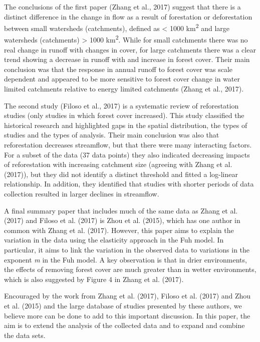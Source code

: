 \documentclass[]{elsarticle} %
\begin{document}
The conclusions of the first paper (Zhang et al., 2017) suggest that there is a distinct difference in the change in flow as a result of forestation or deforestation between small watersheds (catchments), defined as \textless{} 1000 km\textsuperscript{2} and large watersheds (catchments) \textgreater{} 1000 km\textsuperscript{2}. While for small catchments there was no real change in runoff with changes in cover, for large catchments there was a clear trend showing a decrease in runoff with and increase in forest cover. Their main conclusion was that the response in annual runoff to forest cover was scale dependent and appeared to be more sensitive to forest cover change in water limited catchments relative to energy limited catchments (Zhang et al., 2017).

The second study (Filoso et al., 2017) is a systematic review of reforestation studies (only studies in which forest cover increased). This study classified the historical research and highlighted gaps in the spatial distribution, the types of studies and the types of analysis. Their main conclusion was also that reforestation decreases streamflow, but that there were many interacting factors. For a subset of the data (37 data points) they also indicated decreasing impacts of reforestation with increasing catchment size (agreeing with Zhang et al. (2017)), but they did not identify a distinct threshold and fitted a log-linear relationship. In addition, they identified that studies with shorter periods of data collection resulted in larger declines in streamflow.

A final summary paper that includes much of the same data as Zhang et al. (2017) and Filoso et al. (2017) is Zhou et al. (2015), which has one author in common with Zhang et al. (2017). However, this paper aims to explain the variation in the data using the elasticity approach in the Fuh model. In particular, it aims to link the variation in the observed data to variations in the exponent \emph{m} in the Fuh model. A key observation is that in drier environments, the effects of removing forest cover are much greater than in wetter environments, which is also suggested by Figure 4 in Zhang et al. (2017).

Encouraged by the work from Zhang et al. (2017), Filoso et al. (2017) and Zhou et al. (2015) and the large database of studies presented by these authors, we believe more can be done to add to this important discussion. In this paper, the aim is to extend the analysis of the collected data and to expand and combine the data sets.
\end{document}

